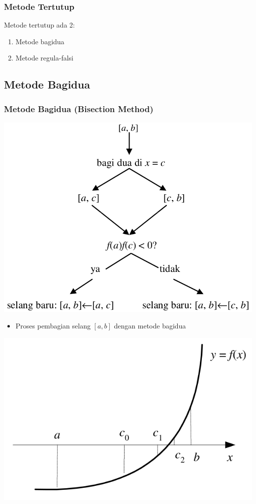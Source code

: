 \documentclass[pdflatex,compress]{beamer}
\begin{document}
\begin{frame}
	\frametitle{Metode Tertutup}
	Metode tertutup ada 2:
	\begin{enumerate}
		\item Metode bagidua
		\item Metode regula-falsi
	\end{enumerate}
\end{frame}

\subsection{Metode Bagidua}

\begin{frame}
	\frametitle{Metode Bagidua (Bisection Method)}
	\begin{center}
		\includegraphics[width=0.7\linewidth]{img/img05.png}
	\end{center}
\end{frame}

\begin{frame}
	\begin{itemize}
		\item Proses pembagian selang $ [a, b] $ dengan metode bagidua
	\end{itemize}
	\begin{center}
		\includegraphics[width=0.7\linewidth]{img/img06.png}
	\end{center}
\end{frame}
\end{document}
